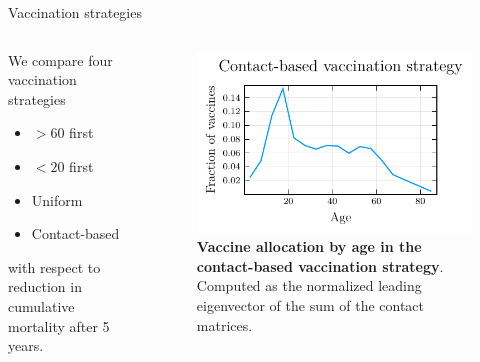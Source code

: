 \documentclass{beamer}
\begin{document}
\begin{frame}{Vaccination strategies}
    \begin{columns}
        \begin{column}{0.5\textwidth}
            We compare four vaccination strategies
            \begin{itemize}
                \item $>60$ first
                \item $<20$ first
                \item Uniform
                \item Contact-based
            \end{itemize}
            with respect to reduction in cumulative mortality after 5 years.
        \end{column}
        \begin{column}{0.5\textwidth}
        \begin{figure}
            \includegraphics[width = \textwidth]{leading_eigenvector.pdf}
            \caption{\textbf{Vaccine allocation by age in the contact-based vaccination strategy}. Computed as the normalized leading eigenvector of the sum of the contact matrices.}
        \end{figure}
        \end{column}
    \end{columns}
\end{frame}
\end{document}
